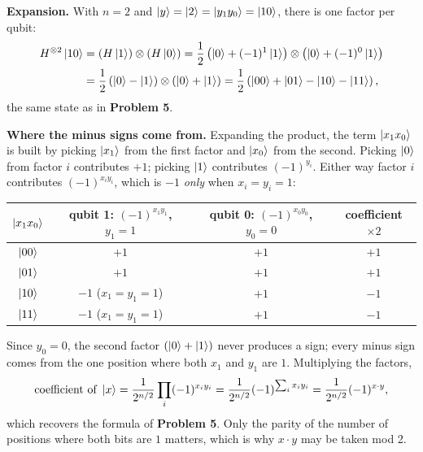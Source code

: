 \documentclass[a4paper, 10pt]{article}
\begin{document}
\begin{solution}
	\noindent \textbf{Expansion.} With \( n = 2 \) and \( \ket{y} = \ket{2} = \ket{y_1 y_0} = \ket{10} \), there is one factor per qubit:
	\begin{align*}
		H^{\otimes 2}\ket{10}
		 & = \left(H\ket{1}\right) \otimes \left(H\ket{0}\right)
		= \frac{1}{2}\left(\ket{0} + (-1)^{1}\ket{1}\right) \otimes \left(\ket{0} + (-1)^{0}\ket{1}\right) \\
		 & = \frac{1}{2}\left(\ket{0} - \ket{1}\right) \otimes \left(\ket{0} + \ket{1}\right)
		= \frac{1}{2}\left(\ket{00} + \ket{01} - \ket{10} - \ket{11}\right),
	\end{align*}
	the same state as in \textbf{Problem 5}.

	\noindent \textbf{Where the minus signs come from.} Expanding the product, the term \( \ket{x_1 x_0} \) is built by picking \( \ket{x_1} \) from the first factor and \( \ket{x_0} \) from the second.
	Picking \( \ket{0} \) from factor \( i \) contributes \( +1 \); picking \( \ket{1} \) contributes \( (-1)^{y_i} \). Either way factor \( i \) contributes \( (-1)^{x_i y_i} \), which is \( -1 \) \emph{only} when \( x_i = y_i = 1 \):
	\begin{center}
		\begin{tabular}{cccc}
			\toprule
			\( \ket{x_1 x_0} \) & qubit 1: \( (-1)^{x_1 y_1} \), \( y_1 = 1 \) & qubit 0: \( (-1)^{x_0 y_0} \), \( y_0 = 0 \) & coefficient \( \times 2 \) \\
			\midrule
			\( \ket{00} \)      & \( +1 \)                                     & \( +1 \)                                     & \( +1 \)                   \\
			\( \ket{01} \)      & \( +1 \)                                     & \( +1 \)                                     & \( +1 \)                   \\
			\( \ket{10} \)      & \( -1 \) \quad (\( x_1 = y_1 = 1 \))         & \( +1 \)                                     & \( -1 \)                   \\
			\( \ket{11} \)      & \( -1 \) \quad (\( x_1 = y_1 = 1 \))         & \( +1 \)                                     & \( -1 \)                   \\
			\bottomrule
		\end{tabular}
	\end{center}
	Since \( y_0 = 0 \), the second factor \( \left(\ket{0} + \ket{1}\right) \) never produces a sign; every minus sign comes from the one position where both \( x_1 \) and \( y_1 \) are \( 1 \).
	Multiplying the factors,
	\[
		\text{coefficient of } \ket{x}
		= \frac{1}{2^{n/2}}\prod_{i} (-1)^{x_i y_i}
		= \frac{1}{2^{n/2}}(-1)^{\sum_i x_i y_i}
		= \frac{1}{2^{n/2}}(-1)^{x \cdot y},
	\]
	which recovers the formula of \textbf{Problem 5}. Only the parity of the number of positions where both bits are \( 1 \) matters, which is why \( x \cdot y \) may be taken mod 2.
\end{solution}
\end{document}
